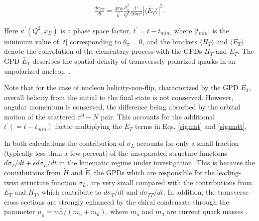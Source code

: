 \documentclass[prc,floatfix,twocolumn,superscriptaddress,letter]{revtex4}
\newcommand{\GPDETbar}{\langle \bar{E}_T \rangle}
\begin{document}
\begin{align}\label{sigmatt}
\frac{d\sigma_{TT}}{dt} = \frac{4\pi\alpha}{k^\prime}\frac{\mu_\pi^2}{Q^8}\frac{t'}{16m^2}\left|\GPDETbar\right|^2.
\end{align}


\noindent Here $\kappa^\prime(Q^2,x_B)$ is a phase space factor, $t^\prime =t-t_{min}$, where $|t_{min}|$ is the minimum value of $|t|$ corresponding to $\theta_\pi =0$, and the brackets $\langle  H_T \rangle$ and $\langle \bar E_T \rangle$ denote
the convolution of the elementary process with the GPDs $H_T$ and $\bar E_T$. The GPD $\bar E_T$  describes the spatial density  of transversely  polarized quarks in an unpolarized nucleon~\cite{diehl_haegler,Goekeler}. 


Note that for the case of nucleon helicity-non-flip, characterized by  the GPD $\bar E_T$, overall helicity from the initial to the final state is not conserved. However,  angular momentum  is conserved, the difference being absorbed by the orbital motion of the scattered 
$\pi^0-N$ pair.  This accounts for the additional $t^\prime (= t-t_{min})$ factor multiplying the $\bar E_T$ terms in Eqs. \ref{sigmat} and \ref{sigmatt}.  



In both calculations the contribution of $\sigma_L$  accounts for only a small fraction (typically less than  a few  percent) of the unseparated  structure functions $d\sigma_T/dt+ \epsilon d\sigma_L/dt$ in the kinematic regime under investigation. This is because  the contributions from $\tilde H$  and $\tilde E$,  the GPDs which are responsible for the leading-twist structure function $\sigma_L$,  are very small compared with the contributions from $\bar E_T$  and $H_T$,  which contribute to $d\sigma_T/dt$ and $d\sigma_{TT}/dt$.
In addition,  the transverse cross sections are strongly enhanced by the chiral condensate through the parameter $\mu_\pi=m^2_\pi/(m_u+m_d)$, where $m_u$ and $m_d$ are current quark masses \cite{G-K-09}.
\end{document}
